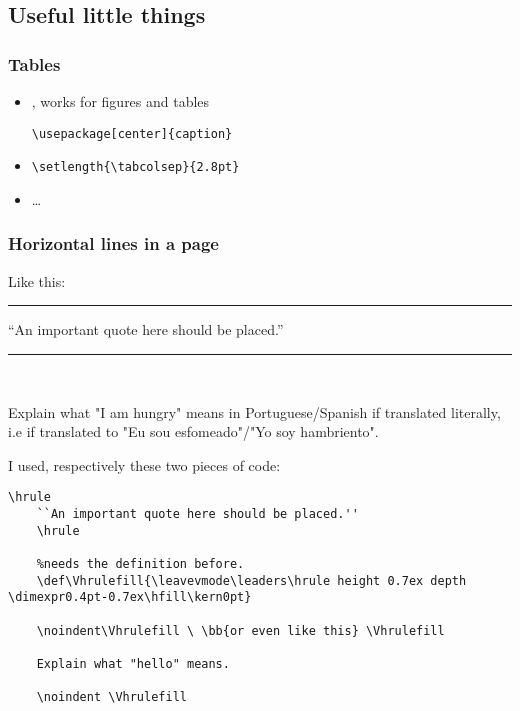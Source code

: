 \subsection{Useful little things}
\subsubsection{Tables}
\begin{itemize}
    \item {}, works for figures and tables
    \begin{lstlisting}[language=Tex]
        \usepackage[center]{caption}
    \end{lstlisting}
    \item {}
    \begin{lstlisting}[language = Tex]
        \setlength{\tabcolsep}{2.8pt}
    \end{lstlisting}
    \item \dots
    
\end{itemize}












\subsubsection{Horizontal lines in a page} 
\par Like this:
\vspace{1cm}

\hrule
``An important quote here should be placed.''
\hrule
\vspace{1cm}
\noindent\Vhrulefill \  \Vhrulefill

Explain what "I am hungry" means in Portuguese/Spanish if translated literally, i.e if translated to "Eu sou esfomeado"/"Yo soy hambriento".

\noindent \Vhrulefill
\vspace{.5cm}

I used, respectively these two pieces of code:
\begin{lstlisting}[language = Tex]
    \hrule
    ``An important quote here should be placed.''
    \hrule

    %needs the definition before.
    \def\Vhrulefill{\leavevmode\leaders\hrule height 0.7ex depth \dimexpr0.4pt-0.7ex\hfill\kern0pt}

    \noindent\Vhrulefill \ \bb{or even like this} \Vhrulefill

    Explain what "hello" means.

    \noindent \Vhrulefill

\end{lstlisting}



